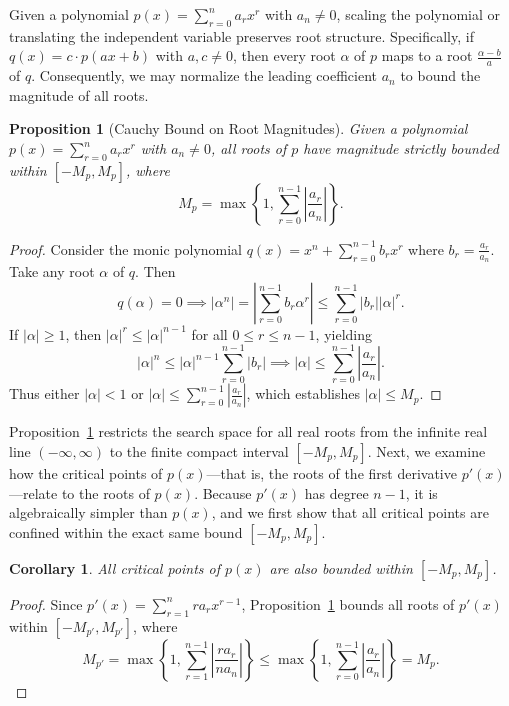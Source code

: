 \documentclass{amsart}
\newtheorem{proposition}{Proposition}
\newtheorem{corollary}{Corollary}
\begin{document}
Given a polynomial $p(x) = \sum_{r=0}^n a_r x^r$ with $a_n \neq 0$, scaling the polynomial or translating the independent variable preserves root structure. Specifically, if $q(x) = c \cdot p(ax+b)$ with $a,c \neq 0$, then every root $\alpha$ of $p$ maps to a root $\frac{\alpha - b}{a}$ of $q$. Consequently, we may normalize the leading coefficient $a_n$ to bound the magnitude of all roots.

\begin{proposition}[Cauchy Bound on Root Magnitudes]\label{prop_root_bound}
    Given a polynomial $p(x) = \sum_{r=0}^n a_r x^r$ with $a_n \neq 0$, all roots of $p$ have magnitude strictly bounded within $[-M_p, M_p]$, where
    \[
        M_p = \max\left\{1, \sum_{r=0}^{n-1}\left|\frac{a_r}{a_n}\right|\right\}.
    \]
\end{proposition}
\begin{proof}
    Consider the monic polynomial $q(x) = x^n + \sum_{r=0}^{n-1}b_r x^r$ where $b_r = \frac{a_r}{a_n}$. Take any root $\alpha$ of $q$. Then
    \[
        q(\alpha)=0 \implies |\alpha^n| = \left|\sum_{r=0}^{n-1}b_r\alpha^r\right| \leq \sum_{r=0}^{n-1}|b_r||\alpha|^r.
    \]
    If $|\alpha| \geq 1$, then $|\alpha|^r \leq |\alpha|^{n-1}$ for all $0 \leq r \leq n-1$, yielding
    \[
        |\alpha|^n \leq |\alpha|^{n-1}\sum_{r=0}^{n-1}|b_r| \implies |\alpha| \leq \sum_{r=0}^{n-1}\left|\frac{a_r}{a_n}\right|.
    \]
    Thus either $|\alpha| < 1$ or $|\alpha| \leq \sum_{r=0}^{n-1}\left|\frac{a_r}{a_n}\right|$, which establishes $|\alpha| \leq M_p$.
\end{proof}

Proposition~\ref{prop_root_bound} restricts the search space for all real roots from the infinite real line $(-\infty, \infty)$ to the finite compact interval $[-M_p, M_p]$. Next, we examine how the critical points of $p(x)$—that is, the roots of the first derivative $p'(x)$—relate to the roots of $p(x)$. Because $p'(x)$ has degree $n - 1$, it is algebraically simpler than $p(x)$, and we first show that all critical points are confined within the exact same bound $[-M_p, M_p]$.

\begin{corollary}
    All critical points of $p(x)$ are also bounded within $[-M_p, M_p]$.
\end{corollary}
\begin{proof}
    Since $p'(x) = \sum_{r=1}^{n} r a_r x^{r-1}$, Proposition~\ref{prop_root_bound} bounds all roots of $p'(x)$ within $[-M_{p'}, M_{p'}]$, where
    \[
        M_{p'} = \max\left\{1, \sum_{r=1}^{n-1}\left|\frac{r a_r}{n a_n}\right|\right\} \leq \max\left\{1, \sum_{r=0}^{n-1}\left|\frac{a_r}{a_n}\right|\right\} = M_p.
    \]
\end{proof}
\end{document}
